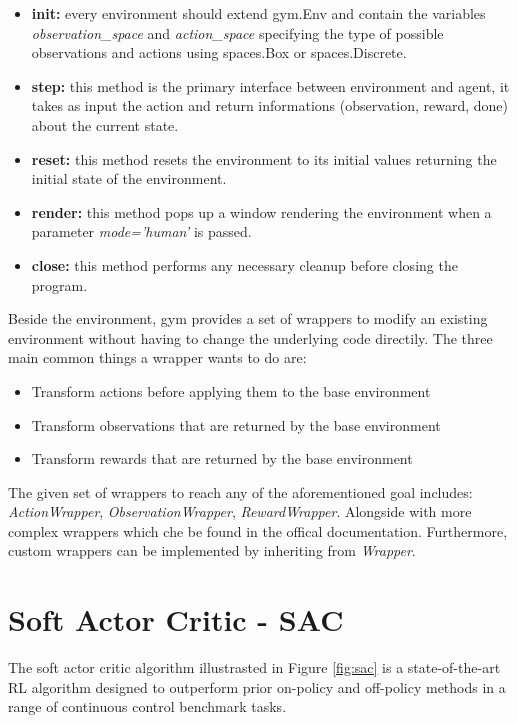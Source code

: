 \begin{center}
  \begin{minipage}{0.45\linewidth}
    
    \end{minipage}
\end{center}

\begin{itemize}
  \item \textbf{init:} every environment should extend gym.Env and contain the variables\\ \textit{observation\_space} and \textit{action\_space} specifying the type of possible observations and actions using spaces.Box or spaces.Discrete.
  \item \textbf{step:} this method is the primary interface between environment and agent, it takes as input the action and return informations (observation, reward, done) about the current state.
  \item \textbf{reset:} this method resets the environment to its initial values returning the initial state of the environment.
  \item \textbf{render:} this method pops up a window rendering the environment when a parameter \textit{mode='human'} is passed.
  \item \textbf{close:} this method performs any necessary cleanup before closing the program.
\end{itemize}
Beside the environment, gym provides a set of wrappers to modify an existing environment without having to change the underlying code directily. The three main common things a wrapper wants to do are:

\begin{itemize}
  \item Transform actions before applying them to the base environment
  \item Transform observations that are returned by the base environment
  \item Transform rewards that are returned by the base environment
\end{itemize}
The given set of wrappers to reach any of the aforementioned goal includes: \textit{ActionWrapper}, \textit{ObservationWrapper}, \textit{RewardWrapper}. Alongside with more complex wrappers which che be found in the offical documentation. Furthermore, custom wrappers can be implemented by inheriting from \textit{Wrapper}.

\section{Soft Actor Critic - SAC}
The soft actor critic algorithm \citep{art:sac} illustrasted in Figure \ref{fig:sac} is a state-of-the-art RL algorithm designed to outperform prior on-policy and off-policy methods in a range of continuous control benchmark tasks. 

